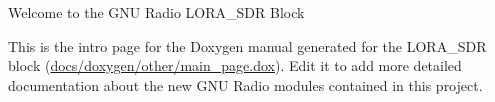 Welcome to the G\+NU Radio L\+O\+R\+A\+\_\+\+S\+DR Block

This is the intro page for the Doxygen manual generated for the L\+O\+R\+A\+\_\+\+S\+DR block (\mbox{\hyperlink{main__page_8dox}{docs/doxygen/other/main\+\_\+page.\+dox}}). Edit it to add more detailed documentation about the new G\+NU Radio modules contained in this project. 